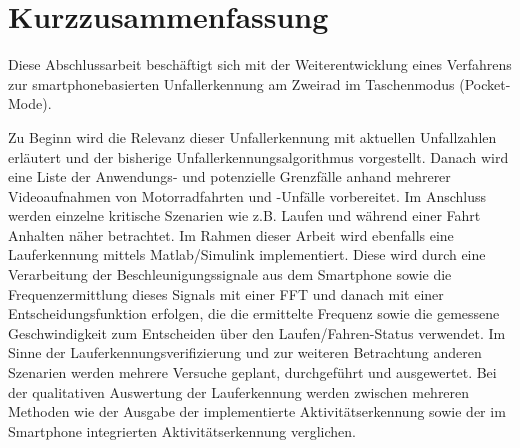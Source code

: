 \chapter*{Kurzzusammenfassung}
%
%
%
%
%
%
%
%
%
%
%
%

Diese Abschlussarbeit beschäftigt sich mit der Weiterentwicklung eines Verfahrens zur smartphonebasierten Unfallerkennung am Zweirad im Taschenmodus (Pocket-Mode). 

Zu Beginn wird die Relevanz dieser Unfallerkennung mit aktuellen Unfall\-zahlen er\-läut\-ert und der bisherige Unfallerkennungsalgorithmus vorgestellt.
Danach wird eine Liste der Anwendungs- und potenzielle Grenzfälle anhand mehrerer Videoaufnahmen von Motorradfahrten und -Unfälle vorbereitet. Im Anschluss werden einzelne kritische Szenarien wie z.B. Laufen und während einer Fahrt Anhalten näher betrachtet.
Im Rahmen dieser Arbeit wird ebenfalls eine Lauferkennung mittels Matlab/Simulink implementiert. Diese wird durch eine Verarbeitung der Beschleunigungssignale aus dem Smartphone sowie die Frequenzermittlung dieses Signals mit einer FFT und danach mit einer Entscheidungsfunktion erfolgen, die die ermittelte Frequenz sowie die gemessene Geschwindigkeit zum Entscheiden über den Laufen/Fahren-Status verwendet.
Im Sinne der Lauferkennungsverifizierung und zur weiteren Betrachtung anderen Szenarien werden mehrere Versuche geplant, durchgeführt und ausgewertet.
Bei der qualitativen Auswertung der Lauferkennung werden zwischen mehreren Methoden wie der Ausgabe der implementierte Aktivitätserkennung sowie der im Smartphone integrierten Aktivitätserkennung verglichen. 
%
%
\begingroup %
\let\cleardoublepage\relax
